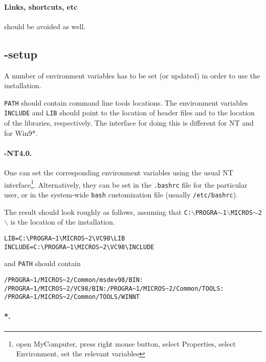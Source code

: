 \paragraph{Links, shortcuts, etc} should be avoided as well.

\subsection{-setup}

A number of environment variables has to be set (or updated)
in order to use the installation.

\texttt{PATH} should contain  command line tools locations.
The environment variables \texttt{INCLUDE} and \texttt{LIB} should
point to the location of  header files and to the location
of the  libraries, respectively.
The interface for doing this is different for NT and for Win9*.

\paragraph{\mswin-NT4.0.}

One can set the corresponding environment variables using the
usual NT interface\footnote{open MyComputer, press right mouse button,
  select Properties, select Environment, set the relevant variables}.
Alternatively, they can be set in the \texttt{.bashrc} file for the
particular user, or in the system-wide \texttt{bash} customization
file (usually \texttt{/etc/bashrc}).

The result should look roughly as follows, assuming that
\texttt{C:$\backslash$PROGRA$\sim$1$\backslash$MICROS$\sim$2$\backslash$}
is the location of the \msvc{} installation.
\begin{verbatim}
LIB=C:\PROGRA~1\MICROS~2\VC98\LIB
INCLUDE=C:\PROGRA~1\MICROS~2\VC98\INCLUDE
\end{verbatim}
and \texttt{PATH} should contain
\begin{verbatim}
/PROGRA~1/MICROS~2/Common/msdev98/BIN:
/PROGRA~1/MICROS~2/VC98/BIN:/PROGRA~1/MICROS~2/Common/TOOLS:
/PROGRA~1/MICROS~2/Common/TOOLS/WINNT
\end{verbatim}

\paragraph{*.} 

